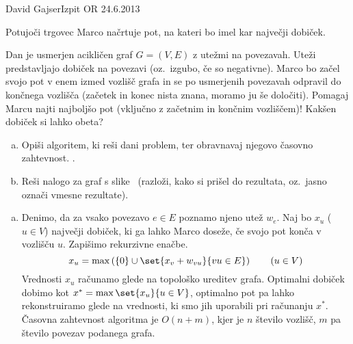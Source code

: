 \begin{naloga}{David Gajser}{Izpit OR 24.6.2013}
\begin{vprasanje}
Potujoči trgovec Marco načrtuje pot, na kateri bo imel kar največji dobiček.

Dan je usmerjen acikličen graf $G = (V, E)$ z utežmi na povezavah.
Uteži predstavljajo dobiček na povezavi (oz.~izgubo, če so negativne).
Marco bo začel svojo pot v enem izmed vozlišč grafa
in se po usmerjenih povezavah odpravil do končnega vozlišča
(začetek in konec nista znana, moramo ju še določiti).
Pomagaj Marcu najti najboljšo pot (vključno z začetnim in končnim vozliščem)!
Kakšen dobiček si lahko obeta?

\begin{enumerate}[(a)]
\item Opiši algoritem, ki reši dani problem,
ter obravnavaj njegovo časovno zahtevnost.
.

\item Reši nalogo za graf s slike~\fig
(razloži, kako si prišel do rezultata, oz.~jasno označi vmesne rezultate).
\end{enumerate}

\begin{slika}
\pgfslika
{}
\end{slika}
\end{vprasanje}

\begin{odgovor}
\begin{enumerate}[(a)]
\item Denimo, da za vsako povezavo $e \in E$
poznamo njeno utež $w_e$.
Naj bo $x_u$ ($u \in V$) največji dobiček,
ki ga lahko Marco doseže, če svojo pot konča v vozlišču $u$.
Zapišimo rekurzivne enačbe.
$$
x_u = \max\left(\{0\} \cup \set{x_v + w_{vu}}{vu \in E}\right)
\qquad (u \in V)
$$
Vrednosti $x_u$ računamo glede na topološko ureditev grafa.
Optimalni dobiček dobimo kot $x^* = \max\set{x_u}{u \in V}$,
optimalno pot pa lahko rekonstruiramo glede na vrednosti,
ki smo jih uporabili pri računanju $x^*$.
Časovna zahtevnost algoritma je $O(n + m)$,
kjer je $n$ število vozlišč, $m$ pa število povezav podanega grafa.


\end{enumerate}
\end{odgovor}
\end{naloga}
